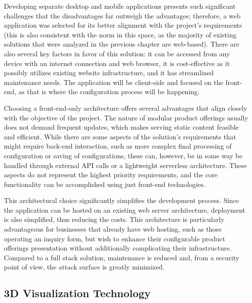 Developing separate desktop and mobile applications presents such significant challenges that the disadvantages far outweigh the advantages; therefore, a web application was selected for its better alignment with the project's requirements (this is also consistent with the norm in this space, as the majority of existing solutions that were analyzed in the previous chapter are web-based). There are also several key factors in favor of this solution: it can be accessed from any device with an internet connection and web browser, it is cost-effective as it possibly utilizes existing website infrastructure, and it has streamlined maintenance needs. The application will be client-side and focused on the front-end, as that is where the configuration process will be happening.

Choosing a front-end-only architecture offers several advantages that align closely with the objective of the project. The nature of modular product offerings usually does not demand frequent updates, which makes serving static content feasible and efficient. While there are some aspects of the solution's requirements that might require back-end interaction, such as more complex final processing of configuration or saving of configurations, these can, however, be in some way be handled through external API calls or a lightweight serverless architecture. These aspects do not represent the highest priority requirements, and the core functionality can be accomplished using just front-end technologies.

This architectural choice significantly simplifies the development process. Since the application can be hosted on an existing web server architecture, deployment is also simplified, thus reducing the costs. This architecture is particularly advantageous for businesses that already have web hosting, such as those operating an inquiry form, but wish to enhance their configurable product offerings presentation without additionally complicating their infrastructure. Compared to a full stack solution, maintenance is reduced and, from a security point of view, the attack surface is greatly minimized.



\subsection{3D Visualization Technology} \label{section:3Dvistech}

